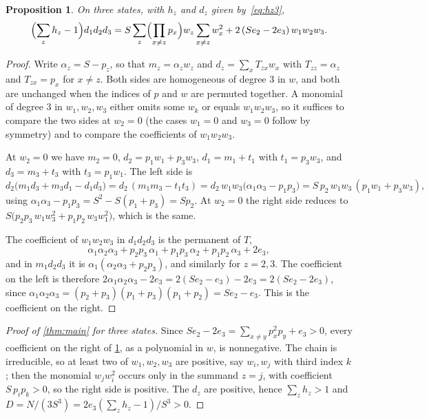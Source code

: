 \documentclass[11pt,a4paper]{article}
\numberwithin{equation}{section}
\newtheorem{proposition}[theorem]{Proposition}
\theoremstyle{remark}
\begin{document}
\begin{proposition}\label{prop:three}
On three states, with $h_z$ and $d_z$ given by~\eqref{eq:hz3},
\[
\Bigl(\sum_zh_z-1\Bigr)d_1d_2d_3=S\sum_{z}\Bigl(\prod_{x\ne z}p_x\Bigr)w_z\sum_{x\ne z}w_x^2+2\,(Se_2-2e_3)\,w_1w_2w_3 .
\]
\end{proposition}

\begin{proof}
Write $\alpha_z=S-p_z$, so that $m_z=\alpha_zw_z$ and $d_z=\sum_xT_{zx}w_x$ with $T_{zz}=\alpha_z$ and $T_{zx}=p_x$ for $x\ne z$. Both sides are homogeneous of degree $3$ in $w$, and both are unchanged when the indices of $p$ and $w$ are permuted together. A monomial of degree $3$ in $w_1,w_2,w_3$ either omits some $w_k$ or equals $w_1w_2w_3$, so it suffices to compare the two sides at $w_2=0$ (the cases $w_1=0$ and $w_3=0$ follow by symmetry) and to compare the coefficients of $w_1w_2w_3$.

At $w_2=0$ we have $m_2=0$, $d_2=p_1w_1+p_3w_3$, $d_1=m_1+t_1$ with $t_1=p_3w_3$, and $d_3=m_3+t_3$ with $t_3=p_1w_1$. The left side is
\[
d_2\bigl(m_1d_3+m_3d_1-d_1d_3\bigr)=d_2\,(m_1m_3-t_1t_3)=d_2\,w_1w_3\bigl(\alpha_1\alpha_3-p_1p_3\bigr)=S\,p_2\,w_1w_3\,(p_1w_1+p_3w_3),
\]
using $\alpha_1\alpha_3-p_1p_3=S^2-S(p_1+p_3)=Sp_2$. At $w_2=0$ the right side reduces to $S\bigl(p_2p_3\,w_1w_3^2+p_1p_2\,w_3w_1^2\bigr)$, which is the same.

The coefficient of $w_1w_2w_3$ in $d_1d_2d_3$ is the permanent of $T$,
\[
\alpha_1\alpha_2\alpha_3+p_2p_3\,\alpha_1+p_1p_3\,\alpha_2+p_1p_2\,\alpha_3+2e_3 ,
\]
and in $m_1d_2d_3$ it is $\alpha_1(\alpha_2\alpha_3+p_2p_3)$, and similarly for $z=2,3$. The coefficient on the left is therefore $2\alpha_1\alpha_2\alpha_3-2e_3=2(Se_2-e_3)-2e_3=2(Se_2-2e_3)$, since $\alpha_1\alpha_2\alpha_3=(p_2+p_3)(p_1+p_3)(p_1+p_2)=Se_2-e_3$. This is the coefficient on the right.
\end{proof}

\begin{proof}[Proof of \cref{thm:main} for three states]
Since $Se_2-2e_3=\sum_{x\ne y}p_x^2p_y+e_3>0$, every coefficient on the right of \cref{prop:three}, as a polynomial in $w$, is nonnegative. The chain is irreducible, so at least two of $w_1,w_2,w_3$ are positive, say $w_i,w_j$ with third index $k$; then the monomial $w_jw_i^2$ occurs only in the summand $z=j$, with coefficient $S\,p_ip_k>0$, so the right side is positive. The $d_z$ are positive, hence $\sum_zh_z>1$ and $D=N/(3S^3)=2e_3(\sum_zh_z-1)/S^3>0$.
\end{proof}
\end{document}
